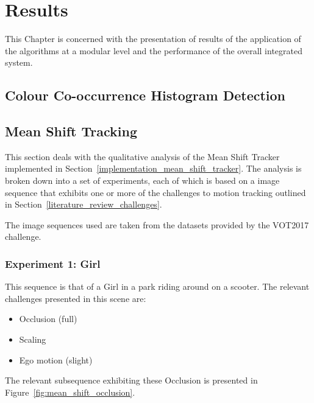 \chapter{Results} \label{chapter_results}

This Chapter is concerned with the presentation of results of the application of
the algorithms at a modular level and the performance of the overall integrated system.


\section{Colour Co-occurrence Histogram Detection}



\section{Mean Shift Tracking}
This section deals with the qualitative analysis of the Mean Shift Tracker
implemented in Section~\ref{implementation_mean_shift_tracker}. The analysis is
broken down into a set of experiments, each of which is based on a image
sequence that exhibits one or more of the challenges to motion tracking outlined
in Section~\ref{literature_review_challenges}. 

The image sequences used are taken from the datasets provided by the VOT2017
challenge. \cite{VOT_TPAMI}

\subsection{Experiment 1: Girl}
This sequence is that of a Girl in a park riding around on a scooter. The
relevant challenges presented in this scene are:

\begin{itemize}
    \item Occlusion (full)
    \item Scaling 
    \item Ego motion (slight) 
\end{itemize}

The relevant subsequence exhibiting these Occlusion is presented in
Figure~\ref{fig:mean_shift_occlusion}.

